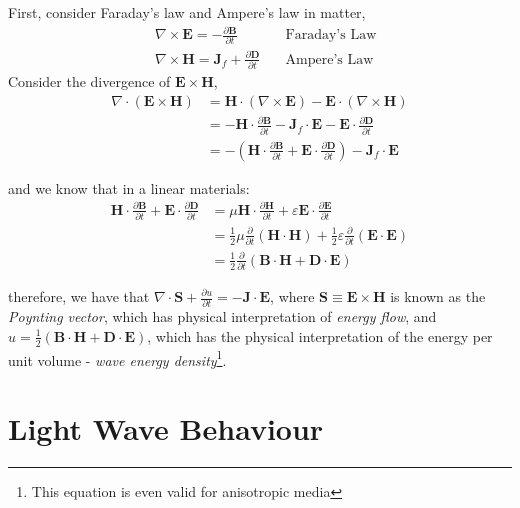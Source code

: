 \documentclass[UTF8]{book}
\begin{document}
First, consider Faraday's law and Ampere's law in matter,
\begin{align*}
&\nabla \times \mathbf{E}=-\frac{\partial \mathbf{B}}{\partial t}\quad &\textrm{Faraday's Law}\\
          &\nabla \times \mathbf{H}=\mathbf{J}_f+\frac{\partial \mathbf{D}}{\partial t}\quad &\textrm{Ampere's Law} 
\end{align*}
Consider the divergence of $\mathbf{E}\times \mathbf{H}$,
\begin{align*}
\nabla \cdot \left(\mathbf{E}\times \mathbf{H}\right)&=\mathbf{H}\cdot \left(\nabla \times \mathbf{E}\right)-\mathbf{E}\cdot \left(\nabla \times \mathbf{H}\right)\\
&=-\mathbf{H}\cdot \frac{\partial \mathbf{B}}{\partial t}-\mathbf{J}_f\cdot \mathbf{E}-\mathbf{E}\cdot \frac{\partial \mathbf{D}}{\partial t}\\
&=-\left(\mathbf{H}\cdot \frac{\partial \mathbf{B}}{\partial t}+\mathbf{E}\cdot \frac{\partial \mathbf{D}}{\partial t}\right)-\mathbf{J}_f\cdot \mathbf{E}
\end{align*}

and we know that in a linear materials:
\begin{align*}
\mathbf{H}\cdot \frac{\partial \mathbf{B}}{\partial t}+\mathbf{E}\cdot \frac{\partial \mathbf{D}}{\partial t}&=\mu \mathbf{H}\cdot \frac{\partial \mathbf{H}}{\partial t}+\varepsilon \mathbf{E}\cdot \frac{\partial \mathbf{E}}{\partial t}\\
&=\frac{1}{2}\mu \frac{\partial }{\partial t}\left(\mathbf{H}\cdot \mathbf{H}\right)+\frac{1}{2}\varepsilon \frac{\partial }{\partial t}\left(\mathbf{E}\cdot \mathbf{E}\right)\\
&=\frac{1}{2}\frac{\partial}{\partial t}\left(\mathbf{B}\cdot \mathbf{H}+\mathbf{D}\cdot \mathbf{E}\right)
\end{align*}

therefore, we have that $\nabla \cdot \mathbf{S}+\frac{\partial u}{\partial t}=-\mathbf{J}\cdot \mathbf{E}$,  where $\mathbf{S}\equiv \mathbf{E}\times \mathbf{H}$ is known as the \emph{Poynting vector}, which has physical interpretation of \emph{energy flow}, and $u=\frac{1}{2}\left(\mathbf{B}\cdot \mathbf{H}+\mathbf{D}\cdot \mathbf{E}\right)$, which has the physical interpretation of the energy per unit volume - \emph{wave energy density}\footnote{This equation is even valid for anisotropic media}.

\chapter{Light Wave Behaviour}
\end{document}
